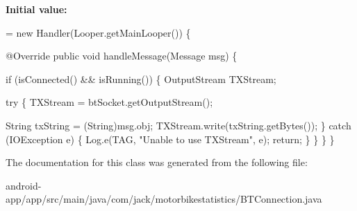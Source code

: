 {\bfseries Initial value\+:}
\begin{DoxyCode}
= \textcolor{keyword}{new} Handler(Looper.getMainLooper()) \{

        @Override
        \textcolor{keyword}{public} \textcolor{keywordtype}{void} handleMessage(Message msg) \{

            
            \textcolor{keywordflow}{if} (isConnected() && isRunning()) \{
                OutputStream TXStream;

                
                \textcolor{keywordflow}{try} \{
                    TXStream = btSocket.getOutputStream();

                    String txString = (String)msg.obj;
                    TXStream.write(txString.getBytes());
                \} \textcolor{keywordflow}{catch} (IOException e) \{
                    Log.e(TAG, \textcolor{stringliteral}{"Unable to use TXStream"}, e);
                    \textcolor{keywordflow}{return};
                \}
            \}
        \}
    \}
\end{DoxyCode}


The documentation for this class was generated from the following file\+:\begin{DoxyCompactItemize}
\item 
android-\/app/app/src/main/java/com/jack/motorbikestatistics/B\+T\+Connection.\+java\end{DoxyCompactItemize}
